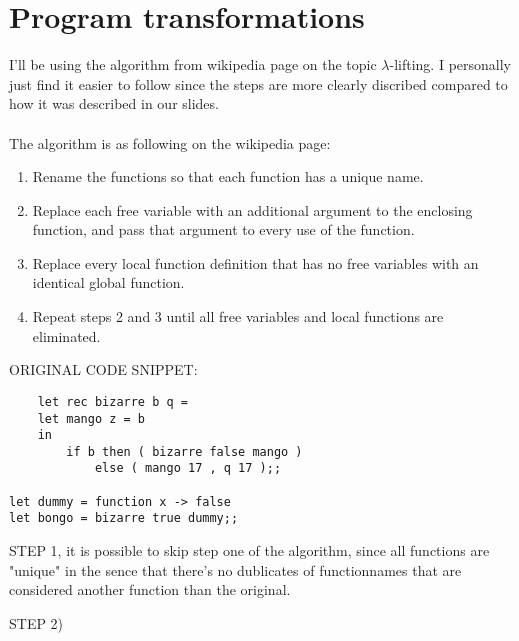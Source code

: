 \section{Program transformations}


I'll be using the algorithm from wikipedia page on the topic $\lambda$-lifting.
I personally just find it easier to follow since
the steps are more clearly discribed compared to how it was described in our slides.
\\
\\
The algorithm is as following on the wikipedia page:
\begin{enumerate}
    \item Rename the functions so that each function has a unique name.
    \item Replace each free variable with an additional argument to the enclosing function, and pass that argument to every use of the function.
    \item Replace every local function definition that has no free variables with an identical global function.
    \item Repeat steps 2 and 3 until all free variables and local functions are eliminated.
\end{enumerate}
\newpage


ORIGINAL CODE SNIPPET:
\begin{verbatim}
    let rec bizarre b q =
    let mango z = b
    in
        if b then ( bizarre false mango )
            else ( mango 17 , q 17 );;

let dummy = function x -> false
let bongo = bizarre true dummy;;
\end{verbatim}

STEP 1, it is possible to skip step one of the algorithm, since all functions
are "unique" in the sence that there's no dublicates of functionnames that are
considered another function than the original.

STEP 2)